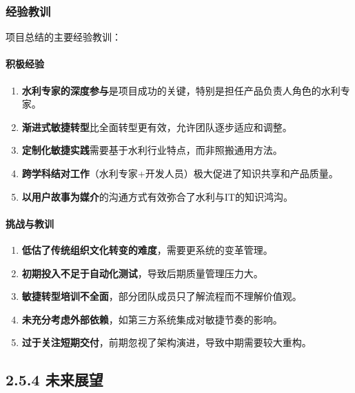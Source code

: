 \subsubsection{经验教训}\label{ux7ecfux9a8cux6559ux8bad}

项目总结的主要经验教训：

\paragraph{积极经验}\label{ux79efux6781ux7ecfux9a8c}

\begin{enumerate}
\def\labelenumi{\arabic{enumi}.}
\item
  \textbf{水利专家的深度参与}是项目成功的关键，特别是担任产品负责人角色的水利专家。
\item
  \textbf{渐进式敏捷转型}比全面转型更有效，允许团队逐步适应和调整。
\item
  \textbf{定制化敏捷实践}需要基于水利行业特点，而非照搬通用方法。
\item
  \textbf{跨学科结对工作}（水利专家+开发人员）极大促进了知识共享和产品质量。
\item
  \textbf{以用户故事为媒介}的沟通方式有效弥合了水利与IT的知识鸿沟。
\end{enumerate}

\paragraph{挑战与教训}\label{ux6311ux6218ux4e0eux6559ux8bad}

\begin{enumerate}
\def\labelenumi{\arabic{enumi}.}
\item
  \textbf{低估了传统组织文化转变的难度}，需要更系统的变革管理。
\item
  \textbf{初期投入不足于自动化测试}，导致后期质量管理压力大。
\item
  \textbf{敏捷转型培训不全面}，部分团队成员只了解流程而不理解价值观。
\item
  \textbf{未充分考虑外部依赖}，如第三方系统集成对敏捷节奏的影响。
\item
  \textbf{过于关注短期交付}，前期忽视了架构演进，导致中期需要较大重构。
\end{enumerate}

\subsection{2.5.4 未来展望}\label{ux672aux6765ux5c55ux671b}

